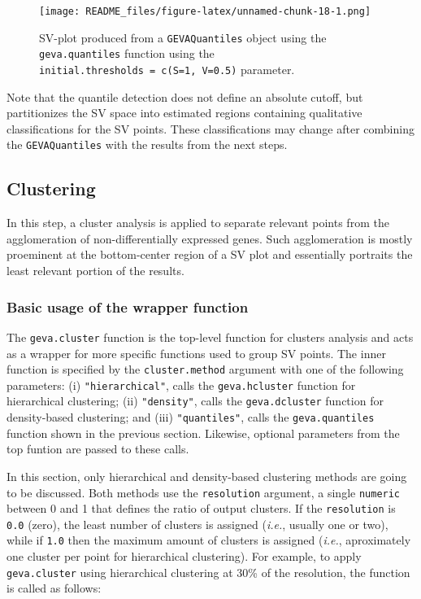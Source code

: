 \documentclass[
  12pt,
]{article}
\begin{document}
\begin{figure}
\centering
\texttt{[image: README\_files/figure-latex/unnamed-chunk-18-1.png]}
\caption{SV-plot produced from a \texttt{GEVAQuantiles} object using the
\texttt{geva.quantiles} function using the
\texttt{initial.thresholds\ =\ c(S=1,\ V=0.5)} parameter.}
\end{figure}

Note that the quantile detection does not define an absolute cutoff, but
partitionizes the SV space into estimated regions containing qualitative
classifications for the SV points. These classifications may change
after combining the \texttt{GEVAQuantiles} with the results from the
next steps.

\hypertarget{clustering}{%
\subsection{Clustering}\label{clustering}}

In this step, a cluster analysis is applied to separate relevant points
from the agglomeration of non-differentially expressed genes. Such
agglomeration is mostly proeminent at the bottom-center region of a SV
plot and essentially portraits the least relevant portion of the
results.

\hypertarget{basic-usage-of-the-wrapper-function}{%
\subsubsection{Basic usage of the wrapper
function}\label{basic-usage-of-the-wrapper-function}}

The \texttt{geva.cluster} function is the top-level function for
clusters analysis and acts as a wrapper for more specific functions used
to group SV points. The inner function is specified by the
\texttt{cluster.method} argument with one of the following parameters:
(i) \texttt{"hierarchical"}, calls the \texttt{geva.hcluster} function
for hierarchical clustering; (ii) \texttt{"density"}, calls the
\texttt{geva.dcluster} function for density-based clustering; and (iii)
\texttt{"quantiles"}, calls the \texttt{geva.quantiles} function shown
in the previous section. Likewise, optional parameters from the top
funtion are passed to these calls.

In this section, only hierarchical and density-based clustering methods
are going to be discussed. Both methods use the \texttt{resolution}
argument, a single \texttt{numeric} between 0 and 1 that defines the
ratio of output clusters. If the \texttt{resolution} is \texttt{0.0}
(zero), the least number of clusters is assigned (\emph{i.e.}, usually
one or two), while if \texttt{1.0} then the maximum amount of clusters
is assigned (\emph{i.e.}, aproximately one cluster per point for
hierarchical clustering). For example, to apply \texttt{geva.cluster}
using hierarchical clustering at 30\% of the resolution, the function is
called as follows:
\end{document}
